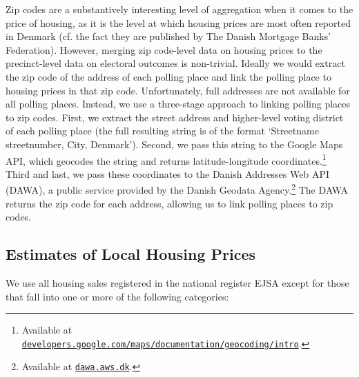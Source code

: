 \documentclass[12pt,a4paper]{article}
\begin{document}
	Zip codes are a substantively interesting level of aggregation when it comes to the price of housing, as it is the level at which housing prices are most often reported in Denmark (cf. the fact they are published by The Danish Mortgage Banks' Federation). However, merging zip code-level data on housing prices to the precinct-level data on electoral outcomes is non-trivial. Ideally we would extract the zip code of the address of each polling place and link the polling place to housing prices in that zip code. Unfortunately, full addresses are not available for all polling places. Instead, we use a three-stage approach to linking polling places to zip codes. First, we extract the street address and higher-level voting district of each polling place (the full resulting string is of the format `Streetname streetnumber, City, Denmark'). Second, we pass this string to the Google Maps API, which geocodes the string and returns latitude-longitude coordinates.\footnote{Available at \texttt{\href{https://developers.google.com/maps/documentation/geocoding/intro}{developers.google.com/maps/documentation/geocoding/intro}}.} Third and last, we pass these coordinates to the Danish Addresses Web API (DAWA), a public service provided by the Danish Geodata Agency.\footnote{Available at \texttt{\href{http://dawa.aws.dk/}{dawa.aws.dk}}.} The DAWA returns the zip code for each address, allowing us to link polling places to zip codes. %
	
	\newpage
	
	\subsection{Estimates of  Local Housing Prices}\label{app_housingselect}
	
	We use all housing sales registered in the national register EJSA except for those that fall into one or more of the following categories:
	
\end{document}
